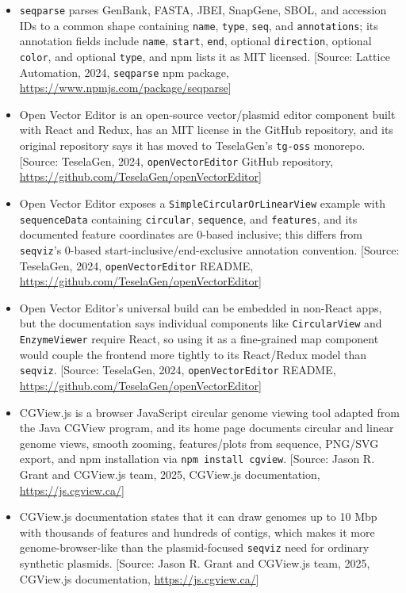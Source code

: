 \documentclass[11pt]{report}
\begin{document}
\begin{itemize}
\item \texttt{seqparse} parses GenBank, FASTA, JBEI, SnapGene, SBOL, and accession IDs to a common shape containing \texttt{name}, \texttt{type}, \texttt{seq}, and \texttt{annotations}; its annotation fields include \texttt{name}, \texttt{start}, \texttt{end}, optional \texttt{direction}, optional \texttt{color}, and optional \texttt{type}, and npm lists it as MIT licensed. [Source: Lattice Automation, 2024, \texttt{seqparse} npm package, \url{https://www.npmjs.com/package/seqparse}]
\item Open Vector Editor is an open-source vector/plasmid editor component built with React and Redux, has an MIT license in the GitHub repository, and its original repository says it has moved to TeselaGen's \texttt{tg-oss} monorepo. [Source: TeselaGen, 2024, \texttt{openVectorEditor} GitHub repository, \url{https://github.com/TeselaGen/openVectorEditor}]
\item Open Vector Editor exposes a \texttt{SimpleCircularOrLinearView} example with \texttt{sequenceData} containing \texttt{circular}, \texttt{sequence}, and \texttt{features}, and its documented feature coordinates are 0-based inclusive; this differs from \texttt{seqviz}'s 0-based start-inclusive/end-exclusive annotation convention. [Source: TeselaGen, 2024, \texttt{openVectorEditor} README, \url{https://github.com/TeselaGen/openVectorEditor}]
\item Open Vector Editor's universal build can be embedded in non-React apps, but the documentation says individual components like \texttt{CircularView} and \texttt{EnzymeViewer} require React, so using it as a fine-grained map component would couple the frontend more tightly to its React/Redux model than \texttt{seqviz}. [Source: TeselaGen, 2024, \texttt{openVectorEditor} README, \url{https://github.com/TeselaGen/openVectorEditor}]
\item CGView.js is a browser JavaScript circular genome viewing tool adapted from the Java CGView program, and its home page documents circular and linear genome views, smooth zooming, features/plots from sequence, PNG/SVG export, and npm installation via \texttt{npm install cgview}. [Source: Jason R. Grant and CGView.js team, 2025, CGView.js documentation, \url{https://js.cgview.ca/}]
\item CGView.js documentation states that it can draw genomes up to 10 Mbp with thousands of features and hundreds of contigs, which makes it more genome-browser-like than the plasmid-focused \texttt{seqviz} need for ordinary synthetic plasmids. [Source: Jason R. Grant and CGView.js team, 2025, CGView.js documentation, \url{https://js.cgview.ca/}]

\end{itemize}
\end{document}
